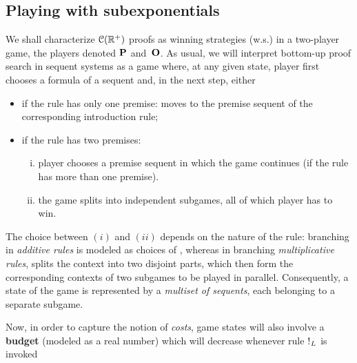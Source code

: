 \subsection{Playing with subexponentials}
We shall  characterize $\mathcal{C}(\mathbb{R}^+)$ proofs as winning strategies (w.s.) in a two-player game, the players denoted $\mathbf{P}$ and~$\mathbf{O}$. As usual, 
we will interpret bottom-up proof search in sequent systems as a game where,  at any given state, player \I first 
chooses a formula of a sequent and, in the next step,  either
\begin{itemize}
\item if the rule has
only one premise: \I moves to the premise sequent of the corresponding introduction rule; 
\item if the rule has two premises: 
\begin{enumerate}[i.]
\item player \II
chooses 
a premise sequent in which the game continues (if the rule has more than one premise).
\item  the game splits into independent subgames, all of
    which player \I has to win. 
\end{enumerate}
\end{itemize}

The choice between $(i)$ and $(ii)$ depends on the nature of the rule:
branching
in {\em additive rules} is modeled as choices of \II, whereas in branching {\em multiplicative rules},  \I   splits the context into two disjoint parts,
which then form the corresponding contexts of two  subgames to
be played in parallel. Consequently, a state of the game is represented
by a \textit{multiset of sequents}, each belonging to a separate subgame. 

Now, in order to capture the notion of {\em costs},  game states  will also involve a {\bf budget} (modeled as a real number) which will decrease whenever rule $\hbox{$\mathop{!}^{}$}_L$ is invoked

